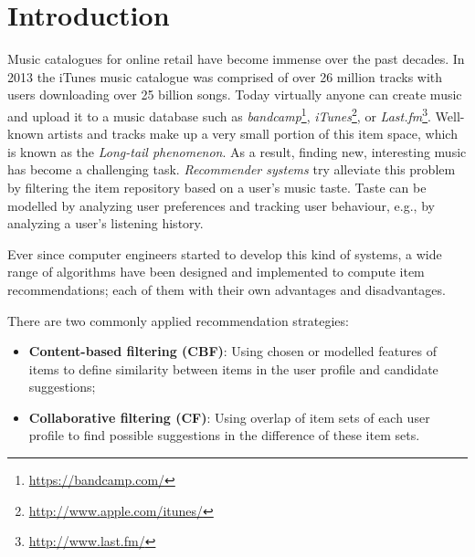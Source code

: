 \chapter{Introduction}\label{chapter:introduction}



Music catalogues for online retail have become immense over the past decades. In 2013 the iTunes music catalogue was comprised of over 26 million tracks with users downloading over 25 billion songs\cite{itunes:2013:sales}. Today virtually anyone can create music and upload it to a music database such as \emph{bandcamp}\footnote{\url{https://bandcamp.com/}}, \emph{iTunes}\footnote{\url{http://www.apple.com/itunes/}}, or \emph{Last.fm}\footnote{\url{http://www.last.fm/}}\cite{bandcamp:2013:artists, itunes:2013:sales, lastfm:2012:home}. Well-known artists and tracks make up a very small portion of this item space, which is known as the \emph{Long-tail phenomenon}\cite{levy:2010}. As a result, finding new, interesting music has become a challenging task. \emph{Recommender systems} try alleviate this problem by filtering the item repository based on a user's music taste. Taste can be modelled by analyzing user preferences and tracking user behaviour, e.g., by analyzing a user's listening history\cite{song:2012}.

Ever since computer engineers started to develop this kind of systems, a wide range of algorithms have been designed and implemented to compute item recommendations\cite{burke:2002, melville:2002:CCF:777092.777124, pazzani:2007:CRS:1768197.1768209, rajaraman:2012}; each of them with their own advantages and disadvantages.

There are two commonly applied recommendation strategies\cite{rajaraman:2012}:

\begin{itemize}
	\item \textbf{Content-based filtering (CBF)}: Using chosen or modelled features of items to define similarity between items in the user profile and candidate suggestions;
	\item \textbf{Collaborative filtering (CF)}: Using overlap of item sets of each user profile to find possible suggestions in the difference of these item sets.
\end{itemize}

